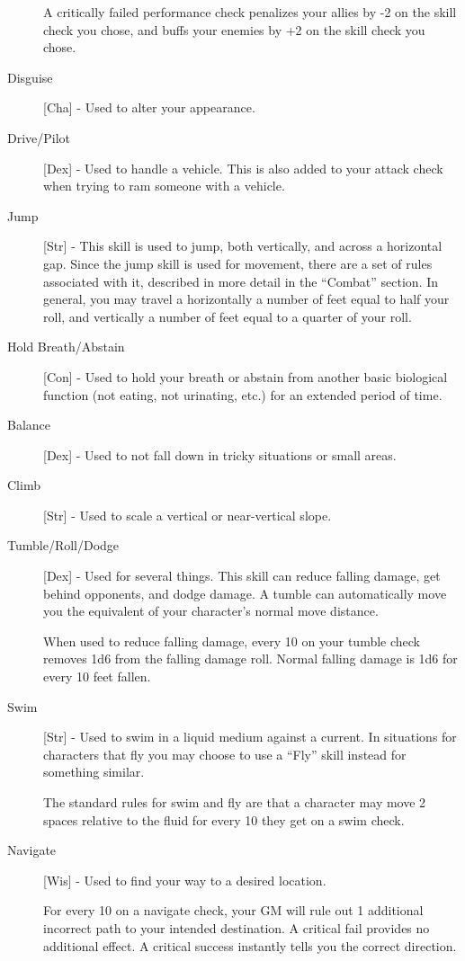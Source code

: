 \begin{description}
A critically failed performance check penalizes your allies by -2 on the skill check you chose, and buffs your enemies by +2 on the skill check you chose.
\item[Disguise] [Cha] - Used to alter your appearance.
\item[Drive/Pilot] [Dex] - Used to handle a vehicle. This is also added to your attack check when trying to ram someone with a vehicle.
\item[Jump] [Str] - This skill is used to jump, both vertically, and across a horizontal gap. Since the jump skill is used for movement, there are a set of rules associated with it, described in more detail in the “Combat” section. In general, you may travel a horizontally a number of feet equal to half your roll, and vertically a number of feet equal to a quarter of your roll.
\item[Hold Breath/Abstain] [Con] - Used to hold your breath or abstain from another basic biological function (not eating, not urinating, etc.) for an extended period of time.
\item[Balance] [Dex] - Used to not fall down in tricky situations or small areas.
\item[Climb] [Str] - Used to scale a vertical or near-vertical slope.
\item[Tumble/Roll/Dodge] [Dex] - Used for several things. This skill can reduce falling damage, get behind opponents, and dodge damage. A tumble can automatically move you the equivalent of your character’s normal move distance.

When used to reduce falling damage, every 10 on your tumble check removes 1d6 from the falling damage roll. Normal falling damage is 1d6 for every 10 feet fallen.

\item[Swim] [Str] - Used to swim in a liquid medium against a current. In situations for characters that fly you may choose to use a ``Fly'' skill instead for something similar. 

The standard rules for swim and fly are that a character may move 2 spaces relative to the fluid for every 10 they get on a swim check.

\item[Navigate] [Wis] - Used to find your way to a desired location.

For every 10 on a navigate check, your GM will rule out 1 additional incorrect path to your intended destination. A critical fail provides no additional effect. A critical success instantly tells you the correct direction.


\end{description}
